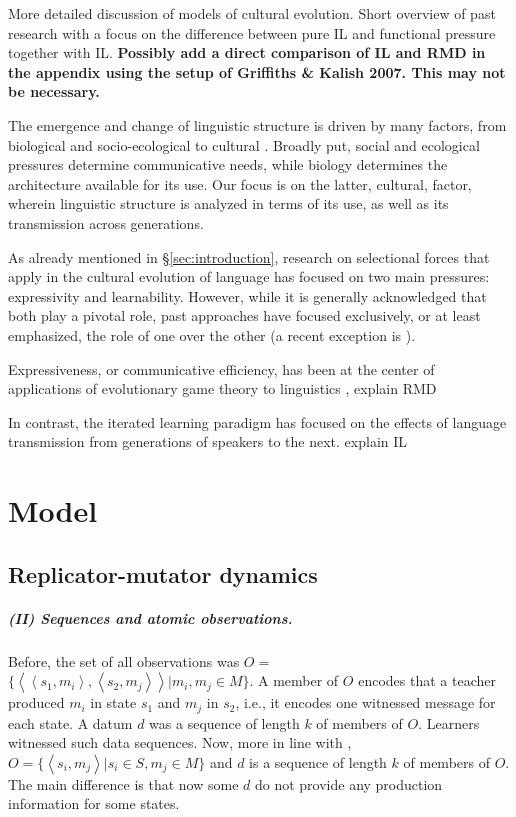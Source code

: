 \documentclass[a4paper]{article}
\newcommand{\tuple}[1]{\ensuremath{\left\langle #1 \right\rangle}}
\newcommand{\hl}[1]{\textcolor[rgb]{.8,.33,.0}{#1}}%
\begin{document}
\hl{More detailed discussion of models of cultural evolution. Short overview of past research with a focus on the difference between pure IL and functional pressure together with IL. {\bf Possibly add a direct comparison of IL and RMD in the appendix using the setup of Griffiths \& Kalish 2007. This may not be necessary.}}

The emergence and change of linguistic structure is driven by many factors, from biological and socio-ecological to cultural \citep{steels:2011,tamariz+kirby:2016}. Broadly put, social and ecological pressures determine communicative needs, while biology determines the architecture available for its use. Our focus is on the latter, cultural, factor, wherein linguistic structure is analyzed in terms of its use, as well as its transmission across generations. 

As already mentioned in \S\ref{sec:introduction}, research on selectional forces that apply in the cultural evolution of language has focused on two main pressures: expressivity and learnability. However, while it is generally acknowledged that both play a pivotal role, past approaches have focused exclusively, or at least emphasized, the role of one over the other (a recent exception is \citealt{kirby+etal:2015}). 

Expressiveness, or communicative efficiency, has been at the center of applications of evolutionary game theory to linguistics \citep{nowak+krakauer:1999,huttegger+zollman:2013},  \hl{explain RMD}


In contrast, the iterated learning paradigm has focused on the effects of language transmission from generations of speakers to the next. \hl{explain IL}


\section{Model}
\subsection{Replicator-mutator dynamics}
\subparagraph{(II) Sequences and atomic observations.} Before, the set of all observations was $O =$\linebreak  $\{\tuple{\tuple{s_1,m_i},\tuple{s_2,m_j}} | m_i, m_j \in M\}$. A member of $O$ encodes that a teacher produced $m_i$ in state $s_1$ and $m_j$ in $s_2$, i.e., it encodes one witnessed message for each state. A datum $d$ was a sequence of length $k$ of members of $O$. Learners witnessed such data sequences. Now, more in line with \citet{griffiths+kalish:2007}, $O = \{\tuple{s_i,m_j} | s_i \in S, m_j \in M\}$ and $d$ is a sequence of length $k$ of members of $O$. The main difference is that now some $d$ do not provide any production information for some states.
\end{document}
